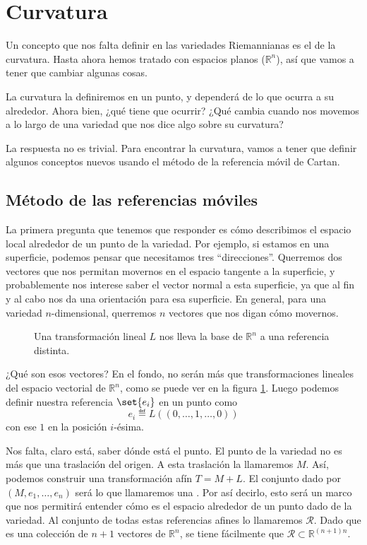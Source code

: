 \section{Curvatura}

Un concepto que nos falta definir en las variedades Riemannianas es el de la curvatura. Hasta ahora hemos tratado con espacios planos ($ℝ^n$), así que vamos a tener que cambiar algunas cosas.

La curvatura la definiremos en un punto, y dependerá de lo que ocurra a su alrededor. Ahora bien, ¿qué tiene que ocurrir? ¿Qué cambia cuando nos movemos a lo largo de una variedad que nos dice algo sobre su curvatura?

La respuesta no es trivial. Para encontrar la curvatura, vamos a tener que definir algunos conceptos nuevos usando el método de la referencia móvil de Cartan.

\subsection{Método de las referencias móviles}

La primera pregunta que tenemos que responder es cómo describimos el espacio local alrededor de un punto de la variedad. Por ejemplo, si estamos en una superficie, podemos pensar que necesitamos tres ``direcciones''. Querremos dos vectores que nos permitan movernos en el espacio tangente a la superficie, y probablemente nos interese saber el vector normal a esta superficie, ya que al fin y al cabo nos da una orientación para esa superficie. En general, para una variedad $n$-dimensional, querremos $n$ vectores que nos digan cómo movernos.

\begin{figure}[hbtp]
\centering
{}
\caption{Una transformación lineal $L$ nos lleva la base de $ℝ^n$ a una referencia distinta.}
\label{figReferencia}
\end{figure}

¿Qué son esos vectores? En el fondo, no serán más que transformaciones lineales del espacio vectorial de $ℝ^n$, como se puede ver en la figura \ref{figReferencia}. Luego podemos definir nuestra referencia $\set{e_i}$ en un punto como \[ e_i ≝ L\left((0,\dotsc,1,\dotsc,0)\right) \] con ese $1$ en la posición $i$-ésima.

Nos falta, claro está, saber dónde está el punto. El punto de la variedad no es más que una traslación del origen. A esta traslación la llamaremos $M$. Así, podemos construir una transformación afín $T = M + L$. El conjunto dado por $(M, e_1, \dotsc, e_n)$ será lo que llamaremos una . Por así decirlo, esto será un marco que nos permitirá entender cómo es el espacio alrededor de un punto dado de la variedad. Al conjunto de todas estas referencias afines lo llamaremos $\mathcal{R}$. Dado que es una colección de $n+1$ vectores de $ℝ^n$, se tiene fácilmente que $\mathcal{R} ⊂ ℝ^{(n+1)n}$.

